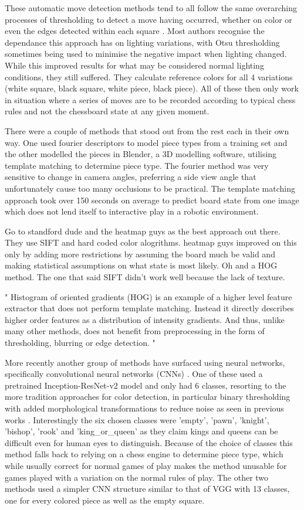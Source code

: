 These automatic move detection methods tend to all follow the same overarching processes of thresholding to detect a move having occurred,
whether on color \cite{} or even the edges detected within each square \cite{}.
Most authors recognise the dependance this approach has on lighting variations, with Otsu thresholding \cite{} sometimes being used to minimise
the negative impact when lighting changed.  While this improved results for what may be considered normal lighting conditions, they still suffered.
They calculate reference colors for all 4 variations (white square, black square, white piece, black piece).
All of these then only work in situation where a series of moves are to be recorded according to typical chess rules and not the chessboard state at any given moment.

There were a couple of methods that stood out from the rest each in their own way.  One used fourier descriptors to model piece types from a training set
and the other modelled the pieces in Blender, a 3D modelling software, utilising template matching to determine piece type.  The fourier method was very sensitive
to change in camera angles, preferring a side view angle that unfortunately cause too many occlusions to be practical.  The template matching approach
took over 150 seconds on average to predict board state from one image which does not lend itself to interactive play in a robotic environment.

Go to standford dude and the heatmap guys as the best approach out there. They use SIFT and hard coded color alogrithms.  heatmap guys improved on this
only by adding more restrictions by assuming the board much be valid and making statistical assumptions on
what state is most likely.  Oh and a HOG method.  The one that said SIFT didn't work well because the lack of texture.

"
Histogram of oriented gradients (HOG) is an example of a higher level feature extractor that does not perform template matching.  Instead it directly describes
higher order features as a distribution of intensity gradients.
And thus, unlike many other methods, does not benefit from preprocessing in the form of thresholding, blurring or edge detection.
"

More recently another group of methods have surfaced using neural networks, specifically convolutional neural networks (CNNs) \cite{}.
One of these used a pretrained Inception-ResNet-v2 model \cite{} and only had 6 classes, resorting to the more tradition approaches for color detection,
in particular binary thresholding with added morphological transformations to reduce noise as seen in previous works \cite{}.
Interestingly the six chosen classes were 'empty', 'pawn', 'knight', 'bishop', 'rook' and 'king\_or\_queen' as they claim kings and queens can be
difficult even for human eyes to distinguish.  Because of the choice of classes this method falls back to relying on a chess engine to determine piece type,
which while usually correct for normal games of play makes the method unusable for games played with a variation on the normal rules of play.
The other two methods used a simpler CNN structure similar to that of VGG \cite{} with 13 classes, one for every colored piece as well as the empty square.


